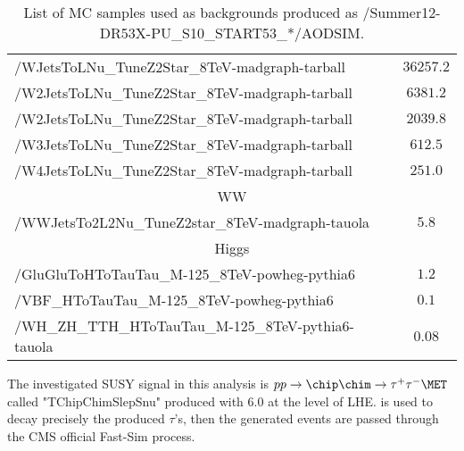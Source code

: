 \begin{table}[!Hhtb]
\begin{center}
{\begin{tabular}{|l|c|}
/WJetsToLNu\_TuneZ2Star\_8TeV-madgraph-tarball          &  $36257.2$              \\
/W2JetsToLNu\_TuneZ2Star\_8TeV-madgraph-tarball         &  $6381.2$               \\
/W2JetsToLNu\_TuneZ2Star\_8TeV-madgraph-tarball         &  $2039.8$               \\
/W3JetsToLNu\_TuneZ2Star\_8TeV-madgraph-tarball         &  $612.5$               \\
/W4JetsToLNu\_TuneZ2Star\_8TeV-madgraph-tarball         &  $251.0$                \\
\hline
\multicolumn{2}{|c|}{WW}\\
\hline
/WWJetsTo2L2Nu\_TuneZ2star\_8TeV-madgraph-tauola        &  $5.8$                \\

\hline
\multicolumn{2}{|c|}{Higgs}\\
\hline
/GluGluToHToTauTau\_M-125\_8TeV-powheg-pythia6          &  $1.2$                \\
/VBF\_HToTauTau\_M-125\_8TeV-powheg-pythia6             &  $0.1$                \\
/WH\_ZH\_TTH\_HToTauTau\_M-125\_8TeV-pythia6-tauola     &  $0.08$\\

\hline

\end{tabular}
}
\end{center}

\caption{  List of MC samples used as backgrounds produced as /Summer12-DR53X-PU\_S10\_START53\_*/AODSIM.}
\label{Tab.MCSamples}
\end{table}

The investigated SUSY signal in this analysis is {\small $pp \rightarrow \chip \chim \rightarrow \tau^+ \tau^- \MET$} called {\small "TChipChimSlepSnu"} produced with \PYTHIA $6.0$ at the level of LHE. \TAUOLA is used to decay precisely the produced $\tau$'s, then the generated events are
passed through the CMS official Fast-Sim process.

